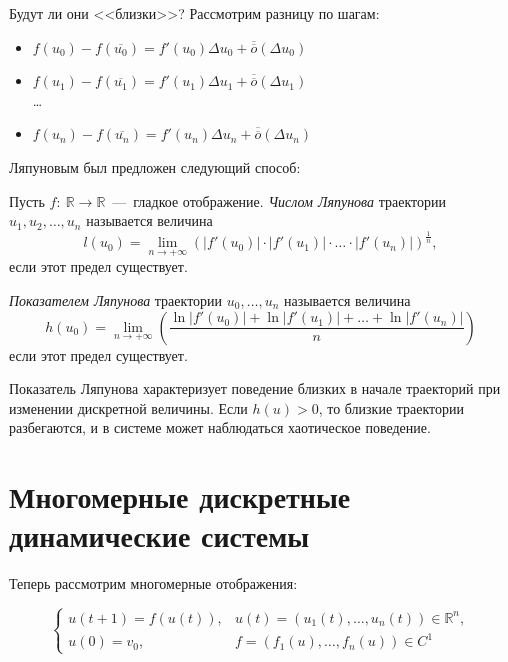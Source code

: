 Будут ли они <<близки>>? Рассмотрим разницу по шагам:
\begin{itemize}

\item $f(u_0) - f(\overline{u_0}) = f'(u_0) \Delta u_0 + \overline{\overline{o}}(\Delta u_0)$
\item $f(u_1) - f(\overline{u_1}) = f'(u_1) \Delta u_1 + \overline{\overline{o}}(\Delta u_1)$\\
\ldots
\item $f(u_n) - f(\overline{u_n}) = f'(u_n) \Delta u_n + \overline{\overline{o}}(\Delta u_n)$

\end{itemize}

Ляпуновым был предложен следующий способ:

\begin{definition}
Пусть $f : \: \mathbb{R} \rightarrow \mathbb{R}$~---~гладкое отображение. \textit{Числом Ляпунова} траектории $u_1, u_2, \ldots , u_n$ называется величина
\begin{equation*}
l(u_0) = \lim \limits_{n \rightarrow + \infty} (|f'(u_0)| \cdot |f'(u_1)| \cdot \ldots \cdot |f'(u_n)|)^{\frac{1}{n}},
\end{equation*}
если этот предел существует.
\end{definition}

\begin{definition}
\textit{Показателем Ляпунова} траектории $u_0, \ldots , u_n$ называется величина
\begin{equation*}
h(u_0) = \lim\limits_{n\rightarrow + \infty} 
\left( \frac{\ln |f'(u_0)| + \ln |f'(u_1)| + \dots + \ln |f'(u_n)|}{n}\right)
\end{equation*}
если этот предел существует.
\end{definition}

Показатель Ляпунова характеризует поведение близких в начале траекторий при изменении дискретной величины. Если $h(u)>0$, то близкие траектории разбегаются, и в системе может наблюдаться хаотическое поведение.

\section{Многомерные дискретные динамические системы}

Теперь рассмотрим многомерные отображения:

\begin{equation}
\begin{cases}
u(t+1) = f(u(t)),&  u(t) = (u_1(t), \ldots , u_n(t)) \in \mathbb{R}^n,\\
u(0) = v_0, & f = (f_1(u), \ldots , f_n(u)) \in C^1
\end{cases}
\end{equation}

